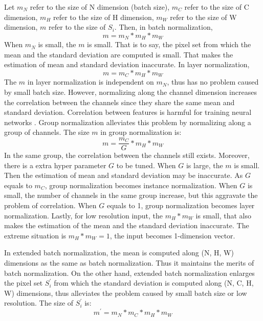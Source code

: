\documentclass[runningheads]{llncs}
\begin{document}
Let $m_{N}$ refer to the size of N dimension (batch size), $m_{C}$ refer to the size of C dimension, $m_{H}$ refer to the size of H dimension, $m_{W}$ refer to the size of W dimension, $m$ refer to the size of $S_{i}$. Then, in batch normalization, 
\begin{equation} \label{bn_m_eq}
m=m_{N}*m_{H}*m_{W}
\end{equation}
When $m_{N}$ is small, the $m$ is small. That is to say, the pixel set from which the mean and the standard deviation are computed is small. That makes the estimation of mean and standard deviation inaccurate. In layer normalization,
\begin{equation} \label{ln_m_eq}
m=m_{C}*m_{H}*m_{W}
\end{equation}
The $m$ in layer normalization is independent on $m_{N}$, thus has no problem caused by small batch size. However, normalizing along the channel dimension increases the correlation between the channels since they share the same mean and standard deviation. Correlation between features is harmful for training neural networks \cite{lecun2012efficient}. Group normalization alleviates this problem by normalizing along a group of channels. The size $m$ in group normalization is:
\begin{equation} \label{ln_m_eq}
m=\frac{m_{C}}{G}*m_{H}*m_{W}
\end{equation}
In the same group, the correlation between the channels still exists. Moreover, there is a extra hyper parameter $G$ to be tuned. When $G$ is large, the $m$ is small. Then the estimation of mean and standard deviation may be inaccurate. As $G$ equals to $m_{C}$, group normalization becomes instance normalization. When $G$ is small, the number of channels in the same group increase, but this aggravate the problem of correlation. When $G$ equals to 1, group normalization becomes layer normalization. Lastly, for low resolution input, the $m_{H}*m_{W}$ is small, that also makes the estimation of the mean and the standard deviation  inaccurate. The extreme situation is $m_{H}*m_{W}=1$, the input becomes 1-dimension vector.

In extended batch normalization, the mean is computed along (N, H, W) dimensions as the same as batch normalization. Thus it maintains the merits of batch normalization. On the other hand, extended batch normalization enlarges the pixel set $S_{i}^{'}$ from which  the standard deviation is computed along (N, C, H, W) dimensions,  thus alleviates the problem caused by small batch size or low resolution.  The size of $S_{i}^{'}$ is: 
\begin{equation} \label{ln_m_eq}
m^{'}=m_{N}*m_{C}*m_{H}*m_{W}
\end{equation}
\end{document}
